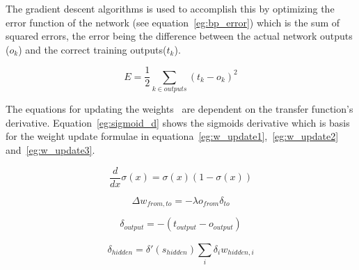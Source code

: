 The gradient descent algorithms is used to accomplish this by optimizing the error function of the network (see equation~\ref{eg:bp_error}) which is the sum of squared errors, the error being the difference between the actual network outputs ($o_k$) and the correct training outputs($t_k$).

\begin{equation} \label{eg:bp_error}
  E=\frac{1}{2}\sum_{k\in outputs}^{}{(t_k-o_k)^2}
\end{equation}

The equations for updating the weights~\cite{koehn1994combining} are dependent on the transfer function's derivative. Equation~\ref{eg:sigmoid_d} shows the sigmoids derivative which is basis for the weight update formulae in equationa~\ref{eg:w_update1},~\ref{eg:w_update2} and~\ref{eg:w_update3}.

\begin{equation} \label{eg:sigmoid_d}
  \frac{d}{dx}\sigma(x)=\sigma(x)(1-\sigma(x))
\end{equation}

\begin{equation} \label{eg:w_update1}
  \Delta w_{from,to} = -\lambda o_{from}\delta_{to}
\end{equation}

\begin{equation} \label{eg:w_update2}
  \delta_{output} = -(t_{output}-o_{output})
\end{equation}

\begin{equation} \label{eg:w_update3}
  \delta_{hidden} = \delta'(s_{hidden})\sum_{i}^{}{\delta_{i}w_{hidden,i}}
\end{equation}
